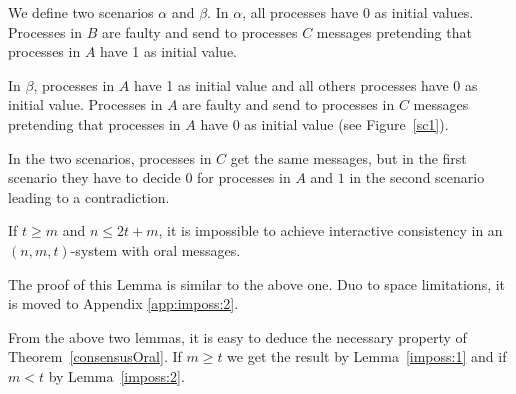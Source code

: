   We define two scenarios $\alpha$ and $\beta$.
  In $\alpha$, all processes have 0 as initial values.
  Processes in $B$ are faulty and send  to processes $C$ messages
  pretending that processes in $A$ have 1 as initial value.
  
  In $\beta$, processes in $A$ have 1 as initial value and all  others processes have 0 as initial value.
  Processes in $A$ are faulty and send to processes in $C$ messages 
  pretending that processes in $A$ have 0 as initial value (see Figure~\ref{sc1}).
  
  In the two scenarios, processes in $C$ get the same messages, but in the first scenario 
  they have to decide 0 for processes in $A$ and $1$ in the second scenario leading to a contradiction.


\begin{lemma}\label{imposs:2}
  If $t \geqslant m$ and $n \leqslant 2t+m$, it is impossible to achieve interactive consistency in an $(n,m,t)$-system with oral messages.\end{lemma}

The proof of this Lemma is similar to the above one. Duo to space limitations, it is moved to Appendix \ref{app:imposs:2}.

From the above two lemmas, it is easy to deduce the necessary property of 
Theorem~\ref{consensusOral}. 
If $m \geqslant t$ we get the result by Lemma~\ref{imposs:1} and  if $m<t$ by Lemma~\ref{imposs:2}.





